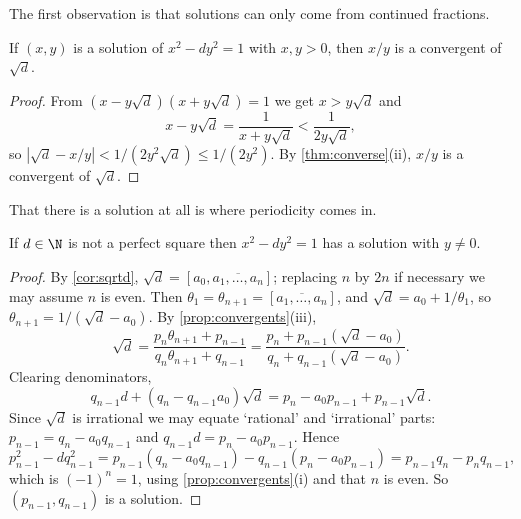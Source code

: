 The first observation is that solutions can only come from continued fractions.

\begin{proposition}\label{prop:pellconv}
	If $(x,y)$ is a solution of $x^2 - dy^2 = 1$ with $x, y > 0$, then $x/y$ is a convergent of $\sqrt d$.
\end{proposition}
\begin{proof}
	From $(x - y\sqrt d)(x+y\sqrt d) = 1$ we get $x > y\sqrt d$ and
	$$
	x - y\sqrt d = \frac1{x+y\sqrt d} < \frac1{2y\sqrt d},
	$$
	so $|\sqrt d - x/y| < 1/(2y^2\sqrt d) \leq 1/(2y^2)$. By \autoref{thm:converse}(ii), $x/y$ is a convergent of $\sqrt d$.
\end{proof}

That there is a solution at all is where periodicity comes in.

\begin{theorem}[Pell]\label{nt-thm:pell}
	If $d \in \N$ is not a perfect square then $x^2 - dy^2 = 1$ has a solution with $y \neq 0$.
\end{theorem}
\begin{proof}
	By \autoref{cor:sqrtd}, $\sqrt d = [a_0, \overline{a_1, \dots, a_n}]$; replacing $n$ by $2n$ if necessary we may assume $n$ is even. Then $\theta_1 = \theta_{n+1} = [\overline{a_1, \dots, a_n}]$, and $\sqrt d = a_0 + 1/\theta_1$, so $\theta_{n+1} = 1/(\sqrt d - a_0)$. By \autoref{prop:convergents}(iii),
	$$
	\sqrt d = \frac{p_n\theta_{n+1}+p_{n-1}}{q_n\theta_{n+1}+q_{n-1}} = \frac{p_n + p_{n-1}(\sqrt d - a_0)}{q_n + q_{n-1}(\sqrt d - a_0)}.
	$$
	Clearing denominators,
	$$
	q_{n-1}d + (q_n - q_{n-1}a_0)\sqrt d = p_n - a_0p_{n-1} + p_{n-1}\sqrt d.
	$$
	Since $\sqrt d$ is irrational we may equate `rational' and `irrational' parts: $p_{n-1} = q_n - a_0q_{n-1}$ and $q_{n-1}d = p_n - a_0p_{n-1}$. Hence
	$$
	p_{n-1}^2 - dq_{n-1}^2 = p_{n-1}(q_n - a_0q_{n-1}) - q_{n-1}(p_n - a_0p_{n-1}) = p_{n-1}q_n - p_nq_{n-1},
	$$
	which is $(-1)^n = 1$,
	using \autoref{prop:convergents}(i) and that $n$ is even. So $(p_{n-1}, q_{n-1})$ is a solution.
\end{proof}

